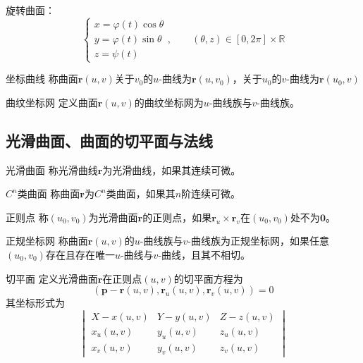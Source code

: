 \documentclass[lang = cn, scheme = chinese, thmcnt = section]{elegantbook}
\newcommand{\R}{\mathbb{R}}            %
\newcommand{\bs}{\boldsymbol}          %
\begin{document}
\begin{example}
	旋转曲面：
	$$
	\begin{cases}
		x=\varphi(t)\cos\theta\\
		y=\varphi(t)\sin\theta\\
		z=\psi(t)
	\end{cases},\qquad (\theta,z)\in [0,2\pi]\times \R
	$$
\end{example}

\begin{definition}{坐标曲线}
	称曲面$\bs{r}(u,v)$关于$v_0$的$u$-曲线为$\bs{r}(u,v_0)$，关于$u_0$的$v$-曲线为$\bs{r}(u_0,v)$
\end{definition}

\begin{definition}{曲纹坐标网}
	定义曲面$\bs{r}(u,v)$的曲纹坐标网为$u$-曲线族与$v$-曲线族。
\end{definition}

\subsection{光滑曲面、曲面的切平面与法线}

\begin{definition}{光滑曲面}
	称光滑曲线$\bs{r}$为光滑曲线，如果其连续可微。
\end{definition}

\begin{definition}{$C^n$类曲面}
	称曲面$\bs{r}$为$C^n$类曲面，如果其$n$阶连续可微。
\end{definition}

\begin{definition}{正则点}
	称$(u_0,v_0)$为光滑曲面$\bs{r}$的正则点，如果$\bs{r}_u\times \bs{r}_v$在$(u_0,v_0)$处不为$\bs{0}$。
\end{definition}

\begin{definition}{正规坐标网}
	称曲面$\bs{r}(u,v)$的$u$-曲线族与$v$-曲线族为正规坐标网，如果任意$(u_0,v_0)$存在且存在唯一$u$-曲线与$v$-曲线，且其不相切。
\end{definition}

\begin{definition}{切平面}
	定义光滑曲面$\bs{r}$在正则点$(u,v)$的切平面方程为%
	$$
	(\bs{p}-\bs{r}(u,v),\bs{r}_u(u,v),\bs{r}_v(u,v))=0
	$$
	其坐标形式为%
	$$
	\begin{vmatrix}
		X-x(u,v) & Y-y(u,v) & Z-z(u,v)\\
		x_u(u,v) & y_u(u,v) & z_u(u,v)\\
		x_v(u,v) & y_v(u,v) & z_v(u,v)
	\end{vmatrix}
	$$
\end{definition}
\end{document}
